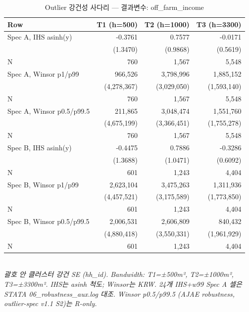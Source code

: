 \begin{table}[t]
\centering
\caption{Outlier 강건성 사다리 — 결과변수: off_farm_income}
\label{tab:rob_outlier_off_farm_income_ko}
\begin{tabular}{lrrr}
\toprule
Row & T1 (h=500) & T2 (h=1000) & T3 (h=3300) \\
\midrule
Spec A, IHS asinh(y) & -0.3761 & 0.7577 & -0.0171 \\
        & (1.3470) & (0.9868) & (0.5619) \\
N       & 760 & 1,567 & 5,548 \\
Spec A, Winsor p1/p99 & 966,526 & 3,798,996 & 1,885,152 \\
        & (4,278,367) & (3,029,050) & (1,593,140) \\
N       & 760 & 1,567 & 5,548 \\
Spec A, Winsor p0.5/p99.5 & 211,865 & 3,048,474 & 1,551,760 \\
        & (4,675,199) & (3,366,451) & (1,755,278) \\
N       & 760 & 1,567 & 5,548 \\
Spec B, IHS asinh(y) & -0.4475 & 0.7886 & -0.3286 \\
        & (1.3688) & (1.0471) & (0.6092) \\
N       & 601 & 1,243 & 4,404 \\
Spec B, Winsor p1/p99 & 2,623,104 & 3,475,263 & 1,311,936 \\
        & (4,457,521) & (3,175,589) & (1,773,850) \\
N       & 601 & 1,243 & 4,404 \\
Spec B, Winsor p0.5/p99.5 & 2,006,531 & 2,606,809 & 840,432 \\
        & (4,880,418) & (3,550,331) & (1,961,929) \\
N       & 601 & 1,243 & 4,404 \\
\bottomrule
\end{tabular}
\\
\footnotesize\textit{괄호 안 클러스터 강건 SE (hh_id). Bandwidth: T1=±500m², T2=±1000m², T3=±3300m². IHS는 asinh 척도; Winsor는 KRW. 24개 IHS+w99 Spec A 셀은 STATA 06_robustness_aux.log 대조. Winsor p0.5/p99.5 (AJAE robustness, outlier-spec v1.1 S2)는 R-only.}
\end{table}


